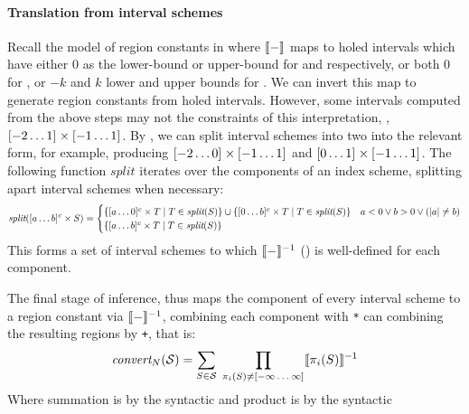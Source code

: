 \paragraph{Translation from interval schemes}

Recall the model of region constants in 
where $\llbracket{} {-} \rrbracket{}$ maps to holed intervals which have either $0$ as
the lower-bound or upper-bound for  and
 respectively, or both $0$ for , or
$-k$ and $k$ lower and upper bounds for . We can
invert this map to generate region constants from holed
intervals. However, some intervals computed from the above steps
may not the constraints of this interpretation,
\eg{}, $\textnormal{$\lbrack-2\dots1\rbrack^{}$} \times \textnormal{$\lbrack-1\dots1\rbrack^{}$}$.  By
, we can split interval schemes into two into
the relevant form, for example, producing
$\textnormal{$\lbrack-2\dots0\rbrack^{}$} \times \textnormal{$\lbrack-1\dots1\rbrack^{}$}$ and
$\textnormal{$\lbrack0\dots1\rbrack^{}$} \times \textnormal{$\lbrack-1\dots1\rbrack^{}$}$. 
The following function
$\textit{split}$ iterates over the components of an index scheme,
splitting apart interval schemes when necessary:
%
\begin{align*}
  \textit{split}(\textnormal{$\lbrack a\dots b\rbrack^{c}$} \times S) =
   \begin{cases}
  \{ \textnormal{$\lbrack a\dots0\rbrack^{c}$} \times T \mid T \in \textit{split}(S) \}
  \cup
  \{ \textnormal{$\lbrack0\dots b\rbrack^{c}$} \times T \mid T \in \textit{split}(S) \}
  & a < 0 \vee b > 0 \vee (|a| \neq b) \\
  \{ \textnormal{$\lbrack a\dots b\rbrack^{c}$} \times T \mid T \in \textit{split}(S) \}
\end{cases}
\end{align*}
%
This forms a set of interval schemes to which $\llbracket{} {-} \rrbracket{}^{-1}$
() is well-defined for each component.

The final stage of inference, thus maps the component
of every interval scheme to a region constant via $\llbracket{} {-} \rrbracket{}^{-1}$,
combining each component with \texttt{*} can combining the
resulting regions by \texttt{+}, that is:
%
%
\begin{align}
\textit{convert}_N(\mathcal{S}) = \sum_{S \in \mathcal{S}} \; \prod_{\pi_i(S) \neq
  \textnormal{$\lbrack-\infty\dots\infty\rbrack^{}$}} \llbracket{} {\pi_i(S)} \rrbracket{}^{-1}
  \label{eq:convert}
\end{align}
%
Where summation is by the syntactic \term{+} and product is by the
syntactic \term{*}

